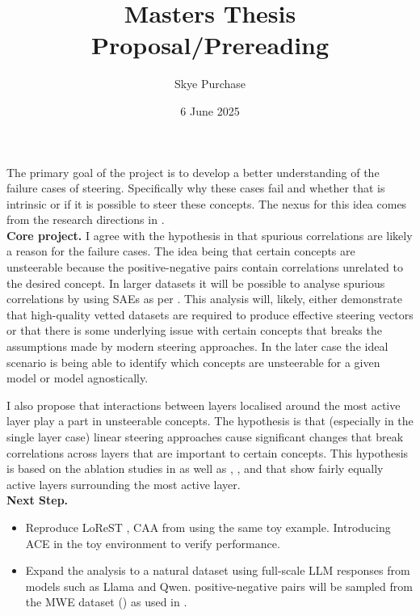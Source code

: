 \documentclass[]{article}
\title{Masters Thesis Proposal/Prereading}
\author{Skye Purchase}
\date{6 June 2025}
\begin{document}
\maketitle

The primary goal of the project is to develop a better understanding of the failure cases of steering.
Specifically why these cases fail and whether that is intrinsic or if it is possible to steer these concepts.
The nexus for this idea comes from the research directions in \cite{steering-taxonomy}. \\

\textbf{Core project.}
I agree with the hypothesis in \cite{steering-taxonomy} that spurious correlations are likely a reason for the failure cases.
The idea being that certain concepts are unsteerable \cite{steerability} because the positive-negative pairs contain correlations unrelated to the desired concept.
In larger datasets it will be possible to analyse spurious correlations by using SAEs as per \cite{dataset_debugging_with_SAEs}.
This analysis will, likely, either demonstrate that high-quality vetted datasets are required to produce effective steering vectors or that there is some underlying issue with certain concepts that breaks the assumptions made by modern steering approaches.
In the later case the ideal scenario is being able to identify which concepts are unsteerable for a given model or model agnostically.

I also propose that interactions between layers localised around the most active layer play a part in unsteerable concepts. The hypothesis is that (especially in the single layer case) linear steering approaches cause significant changes that break correlations across layers that are important to certain concepts. This hypothesis is based on the ablation studies in \cite{steerability} as well as \cite{conceptors}, \cite{function-vectors}, and \cite{steering-theory} that show fairly equally active layers surrounding the most active layer. \\

\textbf{Next Step.}
\begin{itemize}[nolistsep]
    \item Reproduce LoReST \cite{steering-theory}, CAA \cite{caa} from \cite{steering-theory} using the same toy example.
        Introducing ACE \cite{ACE} in the toy environment to verify performance.
    \item Expand the analysis to a natural dataset using full-scale LLM responses from models such as Llama and Qwen.
        positive-negative pairs will be sampled from the MWE dataset (\cite{MWE}) as used in \cite{steerability}.
\end{itemize}

\printbibliography
\end{document}

